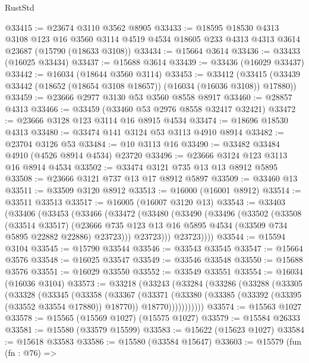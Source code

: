 \begin{lexlean}{RustStd}
\begin{coremodule}
@33415 := @23674 @3110 @3562 @8905
@33433 := @18595
    @18530
    @4313
    @3108
    @123
    @16
    @3560
    @3114
    @4519
    @4534
    @18605
    @233
    @4313
    @4313
    @3614
    @23687
    (@15790 (@18633 @3108))
@33434 := @15664 @3614
@33436 := @33433 (@16025 @33434)
@33437 := @15688 @3614
@33439 := @33436 (@16029 @33437)
@33442 := @16034 (@18644 @3560 @3114)
@33453 := @33412
    (@33415 (@33439 @33442 (@18652 (@18654 @3108 @18657)) (@16034 (@16036 @3108)) @17880))
@33459 := @23666 @2977 @3130 @53 @3560 @8558 @8917
@33460 := @28857 @4313
@33466 := @33459 (@33460 @53 @2976 @8558 @32417 @32421)
@33472 := @23666 @3128 @123 @3114 @16 @8915 @4534
@33474 := @18696 @18530 @4313
@33480 := @33474 @141 @3124 @53 @3113 @4910 @8914
@33482 := @23704 @3126 @53
@33484 := @10 @3113 @16
@33490 := @33482 @33484 @4910 (@4526 @8914 @4534) @23720
@33496 := @23666 @3124 @123 @3113 @16 @8914 @4534
@33502 := @33474 @3121 @735 @13 @13 @8912 @5895
@33508 := @23666 @3121 @737 @13 @17 @8912 @5897
@33509 := @33460 @13
@33511 := @33509 @3120 @8912
@33513 := @16000 (@16001 @8912)
@33514 := @33511 @33513
@33517 := @16005 (@16007 @3120 @13)
@33543 := @33403
    (@33406
      (@33453
        (@33466
          (@33472
            (@33480
              (@33490
                (@33496
                  (@33502
                    (@33508
                      (@33514 @33517)
                      (@23666
                        @735
                        @123
                        @13
                        @16
                        @5895
                        @4534
                        (@33509 @734 @5895 @22882 @22886)
                        @23723)))
                  @23723)))
            @23723))))
@33544 := @15594 @3104
@33545 := @15790 @33544
@33546 := @33543 @33545
@33547 := @15664 @3576
@33548 := @16025 @33547
@33549 := @33546 @33548
@33550 := @15688 @3576
@33551 := @16029 @33550
@33552 := @33549 @33551
@33554 := @16034 (@16036 @3104)
@33573 := @33218
    (@33243
      (@33284
        (@33286
          (@33288
            (@33305
              (@33328
                (@33345
                  (@33358
                    (@33367
                      (@33371
                        (@33380
                          (@33385 (@33392 (@33395 (@33552 @33554 @17880)) @18770))
                          @18770)))))))))))
@33574 := @15563 @1027
@33578 := @15565 (@15569 @1027) (@15575 @1027)
@33579 := @15584 @26333
@33581 := @15580 (@33579 @15599)
@33583 := @15622 (@15623 @1027)
@33584 := @15618 @33583
@33586 := @15580 (@33584 @15647)
@33603 := @15579
    (fun (fn : @76) =>

\end{coremodule}
\end{lexlean}
